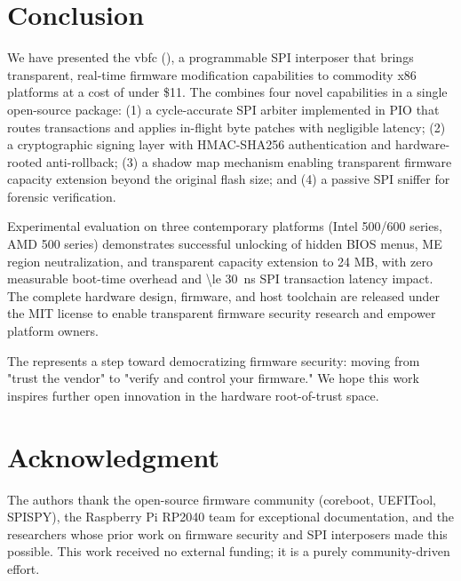 \section{Conclusion}
\label{sec:conclusion}

We have presented the \acf{vbfc} (\vbfc), a programmable \ac{SPI} interposer that brings transparent, real-time firmware modification capabilities to commodity x86 platforms at a cost of under \$11. The \vbfc combines four novel capabilities in a single open-source package: (1) a cycle-accurate \ac{SPI} arbiter implemented in \ac{PIO} that routes transactions and applies in-flight byte patches with negligible latency; (2) a cryptographic signing layer with \ac{HMAC}-\ac{SHA}256 authentication and hardware-rooted anti-rollback; (3) a shadow map mechanism enabling transparent firmware capacity extension beyond the original flash size; and (4) a passive \ac{SPI} sniffer for forensic verification.

Experimental evaluation on three contemporary platforms (Intel 500/600 series, AMD 500 series) demonstrates successful unlocking of hidden \ac{BIOS} menus, \ac{ME} region neutralization, and transparent capacity extension to 24 MB, with zero measurable boot-time overhead and \SI{\le 30}{ns} \ac{SPI} transaction latency impact. The complete hardware design, firmware, and host toolchain are released under the MIT license to enable transparent firmware security research and empower platform owners.

The \vbfc represents a step toward democratizing firmware security: moving from "trust the vendor" to "verify and control your firmware." We hope this work inspires further open innovation in the hardware root-of-trust space.

\section*{Acknowledgment}
The authors thank the open-source firmware community (coreboot, UEFITool, SPISPY), the Raspberry Pi RP2040 team for exceptional documentation, and the researchers whose prior work on firmware security and SPI interposers made this possible. This work received no external funding; it is a purely community-driven effort.